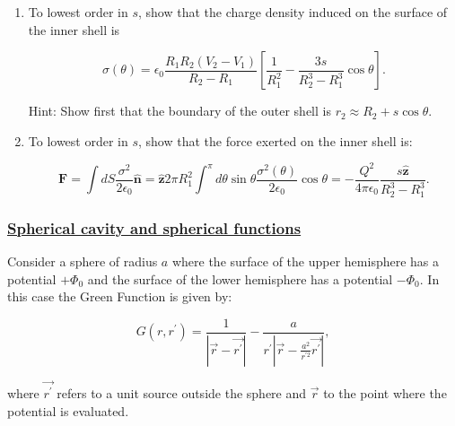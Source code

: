 \begin{enumerate}
	\item To lowest order in $s$, show that the charge density induced on the surface of the inner shell is

	\begin{equation}
		\sigma(\theta)=\epsilon_{0} \frac{R_{1} R_{2}\left(V_{2}-V_{1}\right)}{R_{2}-R_{1}}\left[\frac{1}{R_{1}^{2}}-\frac{3 s}{R_{2}^{3}-R_{1}^{3}} \cos \theta\right].
	\end{equation}

	Hint: Show first that the boundary of the outer shell is $r_{2} \approx R_{2}+s \cos \theta$.

	\item To lowest order in $s$, show that the force exerted on the inner shell is:
	
	\begin{equation}
		\mathbf{F}=\int d S \frac{\sigma^{2}}{2 \epsilon_{0}} \hat{\mathbf{n}}=\hat{\mathbf{z}} 2 \pi R_{1}^{2} \int^{\pi} d \theta \sin \theta \frac{\sigma^{2}(\theta)}{2 \epsilon_{0}} \cos \theta=-\frac{Q^{2}}{4 \pi \epsilon_{0}} \frac{s \hat{\mathbf{z}}}{R_{2}^{3}-R_{1}^{3}}.
	\end{equation}
\end{enumerate}

\subsubsection{\hyperref[Spherical cavity and spherical functions]{Spherical cavity and spherical functions}}

Consider a sphere of radius $a$ where the surface of the upper hemisphere has a potential $+\Phi_{0}$ and the surface of the lower hemisphere has a potential $-\Phi_{0}$. In this case the Green Function is given by:

\begin{equation}
	G\left(r, r^{\prime}\right)=\frac{1}{\left|\vec{r}-\vec{r^{\prime}}\right|}-\frac{a}{r^{\prime}\left|\vec{r}-\frac{a^{2}}{r^{\prime 2}} \vec{r^{\prime}}\right|},
 \end{equation}

 where $\vec{r^{\prime}}$ refers to a unit source outside the sphere and $\vec{r}$ to the point where the potential is evaluated.

